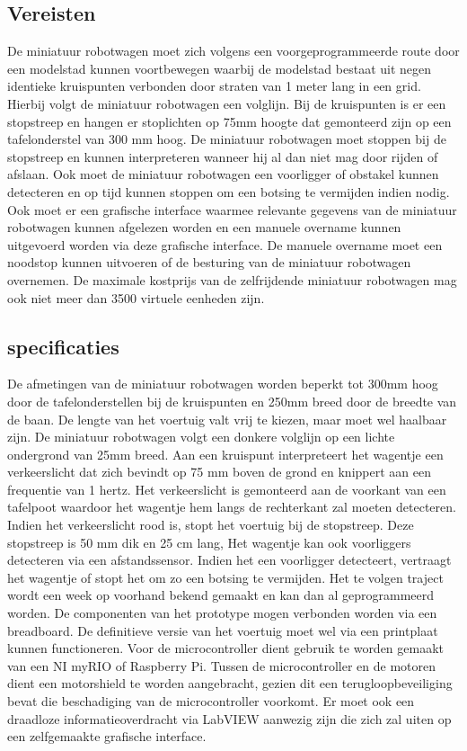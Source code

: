 \documentclass[a4paper,kulak]{kulakarticle}
\begin{document}
\subsection{Vereisten}
De miniatuur robotwagen moet zich volgens een voorgeprogrammeerde route door een modelstad kunnen voortbewegen waarbij de modelstad bestaat uit negen identieke kruispunten verbonden door straten van 1 meter lang in een grid. Hierbij volgt de miniatuur robotwagen een volglijn. Bij de kruispunten is er een stopstreep en hangen er stoplichten op 75mm hoogte dat gemonteerd zijn op een tafelonderstel van 300 mm hoog. De miniatuur robotwagen moet stoppen bij de stopstreep en kunnen interpreteren wanneer hij al dan niet mag door rijden of afslaan. Ook moet de miniatuur robotwagen een voorligger of obstakel kunnen detecteren en op tijd kunnen stoppen om een botsing te vermijden indien nodig. Ook moet er een grafische interface waarmee relevante gegevens van de miniatuur robotwagen kunnen afgelezen worden en een manuele overname kunnen uitgevoerd worden via deze grafische interface. De manuele overname moet een noodstop kunnen uitvoeren of de besturing van de miniatuur robotwagen overnemen. De maximale kostprijs van de zelfrijdende miniatuur robotwagen mag ook niet meer dan 3500 virtuele eenheden zijn.

\subsection{specificaties}
De afmetingen van de miniatuur robotwagen worden beperkt tot 300mm hoog door de tafelonderstellen bij de kruispunten en 250mm breed door de breedte van de baan. De lengte van het voertuig valt vrij te kiezen, maar moet wel haalbaar zijn. De miniatuur robotwagen volgt een donkere volglijn op een lichte ondergrond van 25mm breed. Aan een kruispunt interpreteert het wagentje een verkeerslicht dat zich bevindt op 75 mm boven de grond en knippert aan een frequentie van 1 hertz. Het verkeerslicht is gemonteerd aan de voorkant van een tafelpoot waardoor het wagentje hem langs de rechterkant zal moeten detecteren.  Indien het verkeerslicht rood is, stopt het voertuig bij de stopstreep. Deze stopstreep is 50
mm dik en 25 cm lang, Het wagentje kan ook voorliggers detecteren via een afstandssensor. Indien het een voorligger detecteert, vertraagt het wagentje of stopt het om zo een botsing te
vermijden. Het te volgen traject wordt een week op voorhand bekend gemaakt en kan
dan al geprogrammeerd worden. De componenten van het prototype mogen verbonden worden via een breadboard. De definitieve versie van het voertuig moet wel via
een printplaat kunnen functioneren. Voor de microcontroller dient gebruik te worden
gemaakt van een NI myRIO of Raspberry Pi. Tussen de microcontroller en de motoren dient een motorshield te worden aangebracht, gezien dit een terugloopbeveiliging
bevat die beschadiging van de microcontroller voorkomt. Er moet ook een draadloze informatieoverdracht via LabVIEW aanwezig zijn die zich zal uiten op een zelfgemaakte grafische interface. 
\end{document}
